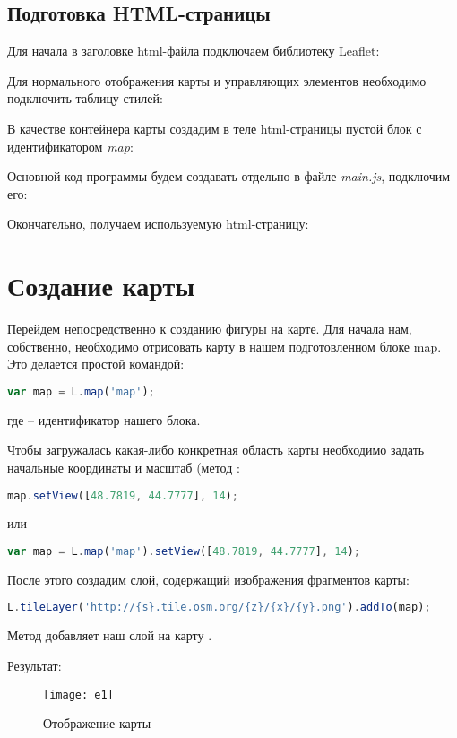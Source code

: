 \subsection{Подготовка HTML-страницы}
Для начала в заголовке html-файла подключаем библиотеку Leaflet:

Для нормального отображения карты и управляющих элементов необходимо 
подключить таблицу стилей:

В качестве контейнера карты создадим в теле html-страницы пустой блок с 
идентификатором \emph{map}:

Основной код программы будем создавать отдельно в файле \emph{main.js}, 
подключим его:

Окончательно, получаем используемую html-страницу:


\section{Создание карты}
Перейдем непосредственно к созданию фигуры на карте. Для начала нам, 
собственно, необходимо отрисовать карту в нашем подготовленном блоке map. 
Это делается простой командой:
\begin{lstlisting}[language=js]
    var map = L.map('map');
\end{lstlisting}
где  -- идентификатор нашего блока.

Чтобы загружалась какая-либо конкретная область карты необходимо задать 
начальные координаты и масштаб (метод 
:
\begin{lstlisting}[language=js]
    map.setView([48.7819, 44.7777], 14);
\end{lstlisting}
или
\begin{lstlisting}[language=js]
    var map = L.map('map').setView([48.7819, 44.7777], 14);
\end{lstlisting}

После этого создадим слой, содержащий изображения фрагментов карты:
\begin{lstlisting}[language=js]
    L.tileLayer('http://{s}.tile.osm.org/{z}/{x}/{y}.png').addTo(map);
\end{lstlisting}
Метод  добавляет наш слой на карту .

Результат:
\begin{figure}[ht!]
    \center
    \texttt{[image: e1]}
    \caption{Отображение карты}
\end{figure}

